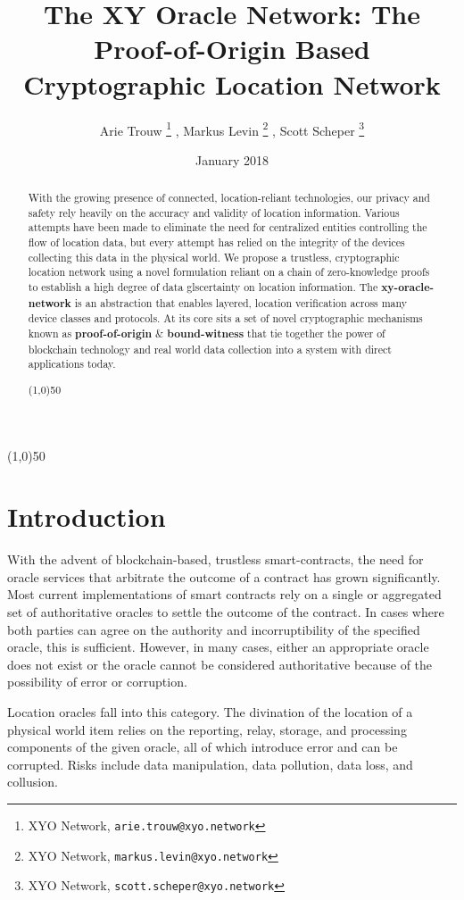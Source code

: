 \documentclass{article}
\title {The XY Oracle Network: The Proof-of-Origin Based Cryptographic Location Network}
\author{
    Arie Trouw
        \thanks{XYO Network, \texttt{arie.trouw@xyo.network}}
    , Markus Levin
        \thanks{XYO Network, \texttt{markus.levin@xyo.network}}
    , Scott Scheper
        \thanks{XYO Network, \texttt{scott.scheper@xyo.network}}
}
\date{January 2018}
\begin{document}
\maketitle

\begin{center}
\line(1,0){50}
\end{center}

\begin{abstract}
With the growing presence of connected, location-reliant technologies, our privacy and safety rely heavily on the \gls{accuracy} and validity of location information. Various attempts have been made to eliminate the need for centralized entities controlling the flow of location data, but every attempt has relied on the integrity of the devices collecting this data in the physical world. We propose a \gls{trustless}, cryptographic location network using a novel formulation reliant on a chain of zero-knowledge proofs to establish a high degree of data gls{certainty} on location information. The \textbf{\Gls{xy-oracle-network}} is an abstraction that enables layered, location verification across many device classes and protocols. At its core sits a set of novel cryptographic mechanisms known as \textbf{\Gls{proof-of-origin}} \& \textbf{\Gls{bound-witness}} that tie together the power of blockchain technology and real world data collection into a system with direct applications today.

\begin{center}
\line(1,0){50}
\end{center}
\end{abstract}

\section{Introduction}
With the advent of blockchain-based, \gls{trustless} \glspl{smart-contract}, the need for \gls{oracle} services that arbitrate the outcome of a contract has grown significantly. Most current implementations of smart contracts rely on a single or aggregated set of authoritative oracles to settle the outcome of the contract. In cases where both parties can agree on the authority and incorruptibility of the specified oracle, this is sufficient. However, in many cases, either an appropriate oracle does not exist or the oracle cannot be considered authoritative because of the possibility of error or corruption.

Location oracles fall into this category. The divination of the location of a physical world item relies on the reporting, relay, storage, and processing components of the given oracle, all of which introduce error and can be corrupted. Risks include data manipulation, data pollution, data loss, and collusion.
\end{document}
